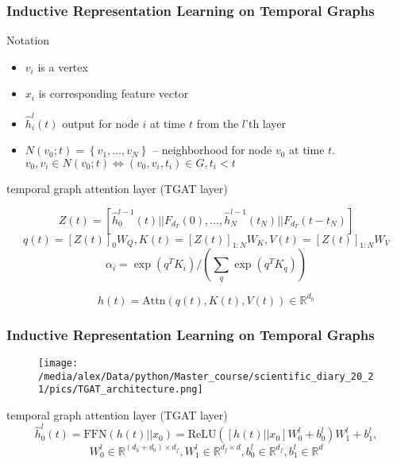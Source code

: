 \documentclass[fleqn, xcolor=x11names]{beamer}
\begin{document}
\begin{frame}\frametitle{Inductive Representation Learning on Temporal Graphs}

\begin{block}{Notation}
\begin{itemize}
\item $v_i$ is a vertex
\item $x_i$ is corresponding feature vector
\item $ \hat{h}_i^l(t) $ output for node $i$ at time $t$ from the $l$'th layer
\item $N(v_0; t) = \left\lbrace v_1, \dots, v_N \right\rbrace $ -- neighborhood for node $v_0$ at time $t$. $v_0, v_i \in N(v_0; t) \Leftrightarrow (v_0, v_i, t_i) \in G, t_i < t $
\end{itemize}
\end{block}

\begin{block}{temporal graph attention layer (TGAT layer)}

$$Z(t) = \left[\hat{h}_0^{l-1}(t)||F_{d_T}(0), \dots, \hat{h}_N^{l-1}(t_N)||F_{d_T}(t-t_N) \right]$$
$$ q(t) = \left[ Z(t) \right]_0W_Q, 
K(t) = \left[ Z(t) \right]_{1:N}W_K, V(t) = \left[ Z(t) \right]_{1:N}W_V$$
$$ \alpha_i = \exp\left(q^TK_i \right)/\left( \sum \limits_q \exp \left( q^T K_q \right) \right) $$

$$ h(t) = \text{Attn}\left(q(t), K(t), V(t) \right) \in \mathbb{R}^{d_h} $$

\end{block}

\end{frame}

\begin{frame}\frametitle{Inductive Representation Learning on Temporal Graphs}

\begin{figure}[h]
\begin{center}
\texttt{[image: /media/alex/Data/python/Master\_course/scientific\_diary\_20\_21/pics/TGAT\_architecture.png]}
\end{center}
\end{figure}

\begin{block}{temporal graph attention layer (TGAT layer)}
$$ \hat{h}_0^l(t) = \text{FFN}\left( h(t)||x_0 \right)
= \text{ReLU} \left( \left[ h(t)||x_0 \right] W^l_0 + b_0^l \right)W_1^l + b_1^l, $$
$$ W_0^l \in \mathbb{R}^{(d_h + d_0) \times d_f}, W_1^l \in \mathbb{R}^{d_f \times d}, b_0^l \in \mathbb{R}^{d_f}, b_1^l \in \mathbb{R}^d  $$
\end{block}

\end{frame}
\end{document}
